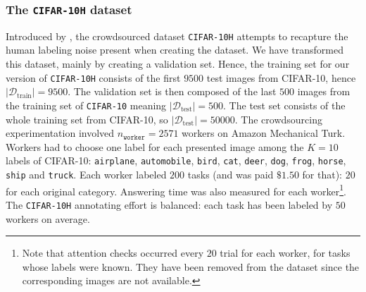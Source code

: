 \subsubsection{The \texttt{CIFAR-10H} dataset}
\label{subsubsec:cifar-10h_dataset}
Introduced by \citet{peterson_human_2019}, the crowdsourced dataset \texttt{CIFAR-10H} attempts to recapture the human labeling noise present when creating the dataset.
We have transformed this dataset, mainly by creating a validation set.
Hence, the training set for our version of \texttt{CIFAR-10H} consists of the first $9500$ test images from CIFAR-10, hence
$|\mathcal{D}_{\text{train}}| = 9500$.
The validation set is then composed of the last $500$ images from the training set of \texttt{CIFAR-10} meaning  $|\mathcal{D}_{\text{test}}| = 500 $.
The test set consists of the whole training set from CIFAR-10, so  $|\mathcal{D}_{\text{test}}| = 50000$.
The crowdsourcing experimentation involved $n_\texttt{worker}=2571$ workers on Amazon Mechanical Turk.
Workers had to choose one label for each presented image among the $K=10$ labels of CIFAR-10: \texttt{airplane}, \texttt{automobile}, \texttt{bird}, \texttt{cat}, \texttt{deer}, \texttt{dog}, \texttt{frog}, \texttt{horse}, \texttt{ship} and \texttt{truck}.
Each worker labeled $200$ tasks (and was paid $\$1.50$ for that): $20$ for each original category.
Answering time was also measured for each worker\footnote{Note that attention checks occurred every $20$ trial for each worker, for tasks whose labels were known.
They have been removed from the dataset since the corresponding images are not available.}.
The \texttt{CIFAR-10H} annotating effort is balanced: each task has been labeled by $50$ workers on average.
